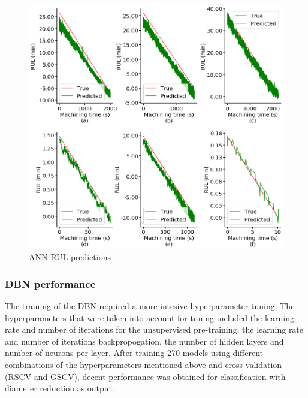 \documentclass[preprint,review,12pt]{elsarticle}
\begin{document}
\begin{figure}[!h]
  \begin{center}
    \includegraphics[width=\linewidth]{57.png}
    \caption{ANN RUL predictions}\label{fig:fig57}
  \end{center}
\end{figure}

\subsubsection{DBN performance}
The training of the DBN required a more intesive hyperparameter tuning. The hyperparameters that were taken into account for tuning included the learning rate and number of iterations for the unsupervised pre-training, the learning rate and number of iterations backpropogation, the number of hidden layers and number of neurons per layer.
After training 270 models using different combinations of the hyperparameters mentioned above and cross-validation (RSCV and GSCV), decent performance was obtained for classification with diameter reduction as output. \par
\end{document}
